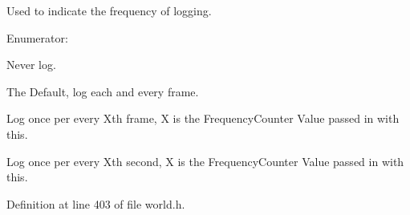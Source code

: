 Used to indicate the frequency of logging. 

\begin{Desc}
\item[Enumerator: ]\par
\begin{description}
\item[{\em 
\hypertarget{classMezzanine_1_1World_a535c832832bbdebcdc623c3472a32e25abf336536d5cf6396466067a847f64e3d}{
LogNever}
\label{classMezzanine_1_1World_a535c832832bbdebcdc623c3472a32e25abf336536d5cf6396466067a847f64e3d}
}]Never log. \item[{\em 
\hypertarget{classMezzanine_1_1World_a535c832832bbdebcdc623c3472a32e25ac1d6f9aa441fdc15961f28f18bbdbdb2}{
LogOncePerFrame}
\label{classMezzanine_1_1World_a535c832832bbdebcdc623c3472a32e25ac1d6f9aa441fdc15961f28f18bbdbdb2}
}]The Default, log each and every frame. \item[{\em 
\hypertarget{classMezzanine_1_1World_a535c832832bbdebcdc623c3472a32e25a1d4113b21efd91ab73056970906fafe5}{
LogOncePerXFrames}
\label{classMezzanine_1_1World_a535c832832bbdebcdc623c3472a32e25a1d4113b21efd91ab73056970906fafe5}
}]Log once per every Xth frame, X is the FrequencyCounter Value passed in with this. \item[{\em 
\hypertarget{classMezzanine_1_1World_a535c832832bbdebcdc623c3472a32e25adf1caf2c27e4c4e6178c13e8579ab872}{
LogOncePerXSeconds}
\label{classMezzanine_1_1World_a535c832832bbdebcdc623c3472a32e25adf1caf2c27e4c4e6178c13e8579ab872}
}]Log once per every Xth second, X is the FrequencyCounter Value passed in with this. \end{description}
\end{Desc}



Definition at line 403 of file world.h.



